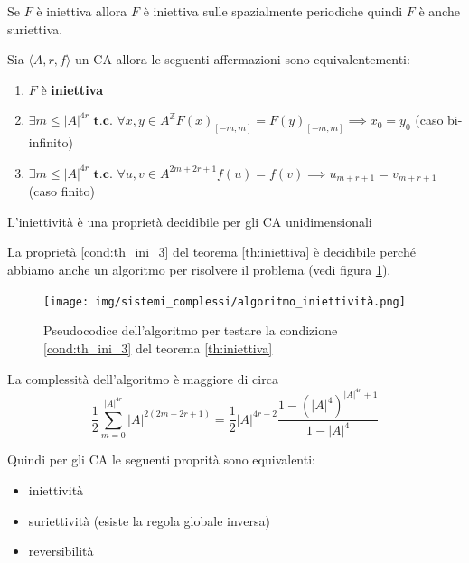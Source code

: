 \begin{teorema}
    Se $F$ è iniettiva allora $F$ è iniettiva sulle spazialmente periodiche quindi
    $F$ è anche suriettiva.
\end{teorema}

\begin{teorema}
    \label{th:iniettiva}
    Sia $\langle A,r,f\rangle$ un CA allora le seguenti affermazioni sono equivalentementi:
    \begin{enumerate}
        \item $F$ è \textbf{iniettiva}
        \item $\exists m \le |A|^{4r} \textbf{ t.c. } \forall x, y \in A^\mathbb{Z} F(x)_{[-m,m]}=F(y)_{[-m,m]} \implies x_0=y_0$
              (caso bi-infinito)
        \item \label{cond:th_ini_3}$\exists m \le |A|^{4r} \textbf{ t.c. } \forall u,v \in A^{2m+2r+1} f(u)= f(v) \implies u_{m+r+1} = v_{m+r+1}$
              (caso finito)
    \end{enumerate}
\end{teorema}
\begin{teorema}
    L'iniettività è una proprietà decidibile per gli CA unidimensionali


\end{teorema}
La proprietà \ref{cond:th_ini_3} del teorema \ref{th:iniettiva} è decidibile perché
abbiamo anche un algoritmo per risolvere il problema (vedi figura \ref{fig:algo_iniettiva}).
\begin{figure}[!h]
    \centering
    \texttt{[image: img/sistemi\_complessi/algoritmo\_iniettività.png]}
    \caption{Pseudocodice dell'algoritmo per testare la condizione \ref{cond:th_ini_3} del teorema \ref{th:iniettiva}}
    \label{fig:algo_iniettiva}
\end{figure}
\begin{nota}
    La complessità dell'algoritmo è maggiore di circa
    \begin{equation*}
        \frac{1}{2} \sum_{m=0}^{|A|^{4r}} |A|^{2(2m+2r+1)} = \frac{1}{2}  |A|^{4r+2}
        \frac{1-(|A|^4)^{|A|^{4r}+1}}{1-|A|^4}
    \end{equation*}
\end{nota}

Quindi per gli CA le seguenti proprità sono equivalenti:
\begin{itemize}
    \item iniettività
    \item suriettività (esiste la regola globale inversa)
    \item reversibilità
\end{itemize}

